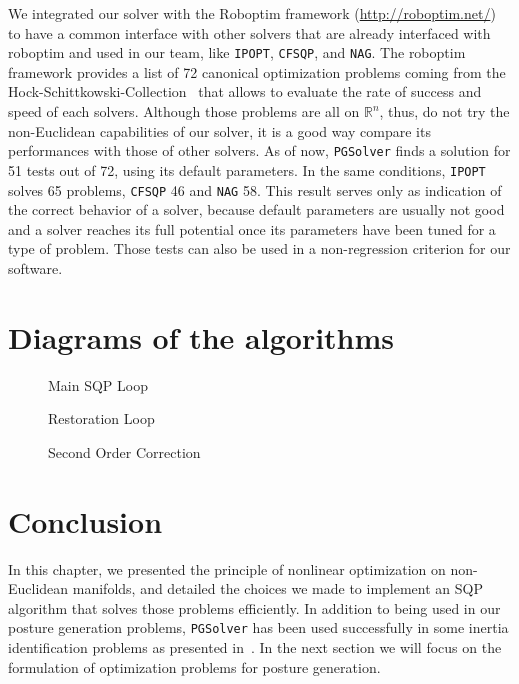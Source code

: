 We integrated our solver with the Roboptim framework (\href{http://roboptim.net/}{http://roboptim.net/}) to have a common interface with other solvers that are already interfaced with roboptim and used in our team, like {\tt IPOPT}, {\tt CFSQP}, and {\tt NAG}.
The roboptim framework provides a list of 72 canonical optimization problems coming from the Hock-Schittkowski-Collection~\cite{Hock1980} that allows to evaluate the rate of success and speed of each solvers.
Although those problems are all on $\mathbb{R}^n$, thus, do not try the non-Euclidean capabilities of our solver, it is a good way compare its performances with those of other solvers.
As of now, {\tt PGSolver} finds a solution for 51 tests out of 72, using its default parameters.
In the same conditions, {\tt IPOPT} solves 65 problems, {\tt CFSQP} 46 and {\tt NAG} 58.
This result serves only as indication of the correct behavior of a solver, because default parameters are usually not good and a solver reaches its full potential once its parameters have been tuned for a type of problem.
Those tests can also be used in a non-regression criterion for our software.


\section{Diagrams of the algorithms}
\label{sec:diagrams_of_the_algorithms}

\begin{figure}[htpb]
  \centering
  
  \caption{Main SQP Loop}
\label{fig:main_sqp_loop}
\end{figure}

\begin{figure}[htpb]
  \begin{minipage}{.5\textwidth}
    \centering
    
    \caption{Restoration Loop}
\label{fig:restoration_loop}
  \end{minipage}%
  \begin{minipage}{.5\textwidth}
    \centering
    
    \caption{Second Order Correction}
\label{fig:second_order_correction}
  \end{minipage}%
\end{figure}

\section{Conclusion}
\label{sec:conclusion}

In this chapter, we presented the principle of nonlinear optimization on non-Euclidean manifolds, and detailed the choices we made to implement an SQP algorithm that solves those problems efficiently.
In addition to being used in our posture generation problems, {\tt PGSolver} has been used successfully in some inertia identification problems as presented in~\cite{traversaro:iros:2016}.
In the next section we will focus on the formulation of optimization problems for posture generation.


